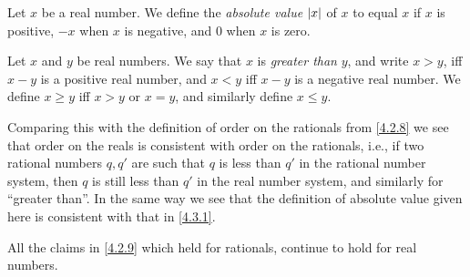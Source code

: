 \begin{defn}\label{5.4.5}
  Let \(x\) be a real number.
  We define the \emph{absolute value} \(\left\lvert x\right\rvert\) of \(x\) to equal \(x\) if \(x\) is positive, \(-x\) when \(x\) is negative, and \(0\) when \(x\) is zero.
\end{defn}

\begin{defn}\label{5.4.6}
  Let \(x\) and \(y\) be real numbers.
  We say that \(x\) is \emph{greater than} \(y\), and write \(x > y\), iff \(x - y\) is a positive real number, and \(x < y\) iff \(x - y\) is a negative real number.
  We define \(x \geq y\) iff \(x > y\) or \(x = y\), and similarly define \(x \leq y\).
\end{defn}

\begin{note}
  Comparing this with the definition of order on the rationals from \cref{4.2.8} we see that order on the reals is consistent with order on the rationals, i.e., if two rational numbers \(q, q'\) are such that \(q\) is less than \(q'\) in the rational number system, then \(q\) is still less than \(q'\) in the real number system, and similarly for ``greater than''.
  In the same way we see that the definition of absolute value given here is consistent with that in \cref{4.3.1}.
\end{note}

\begin{prop}\label{5.4.7}
  All the claims in \cref{4.2.9} which held for rationals, continue to hold for real numbers.
\end{prop}

